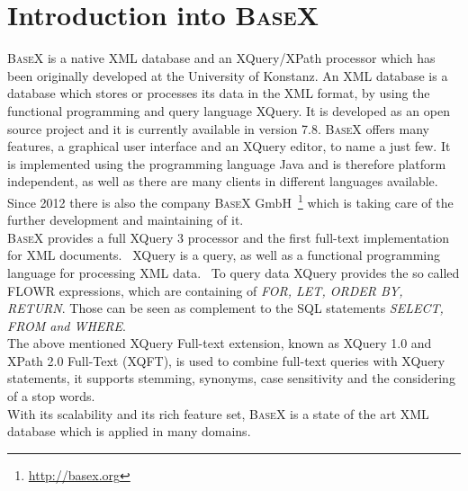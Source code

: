 \section{Introduction into \textsc{BaseX}}
\label{sec:overview:introduction-into-basex}
\textsc{BaseX} is a native XML database and an XQuery/XPath processor which has been originally developed at the University of Konstanz.
An XML database is a database which stores or processes its data in the XML format, by using the functional programming and query language XQuery.
It is developed as an open source project and it is currently available in version 7.8.
\textsc{BaseX} offers many features, a graphical user interface and an XQuery editor, to name a just few.
It is implemented using the programming language Java and is therefore platform independent, as well as there are many clients in different languages available.
Since 2012 there is also the company \textsc{BaseX} GmbH~\footnote{\url{http://basex.org}} which is taking care of the further development and maintaining of it.\\
\textsc{BaseX} provides a full XQuery 3 processor and the first full-text implementation for XML documents.~\cite{grun2009xquery}
XQuery is a query, as well as a functional programming language for processing XML data.~\cite{boag2002xquery} 
To query data XQuery provides the so called FLOWR expressions, which are containing of \textit{FOR, LET, ORDER BY, RETURN}.
Those can be seen as complement to the SQL statements \textit{SELECT, FROM and WHERE}.\\
The above mentioned XQuery Full-text extension, known as XQuery 1.0 and XPath 2.0 Full-Text (XQFT), is used to combine full-text queries with XQuery statements, it supports stemming, synonyms, case sensitivity and the considering of a stop words.~\cite{amer2006xquery}\\
With its scalability and its rich feature set, \textsc{BaseX} is a state of the art XML database which is applied in many domains.

